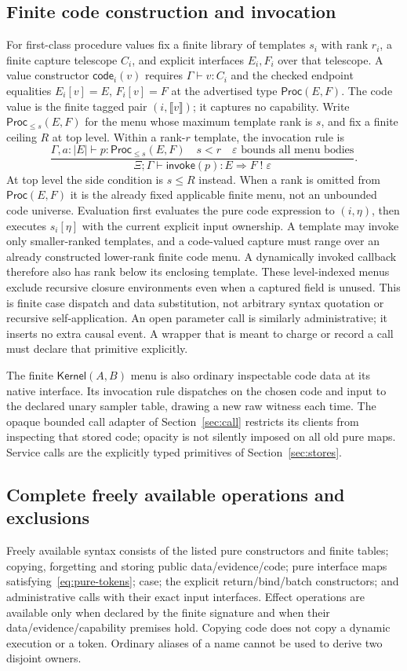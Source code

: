 \documentclass[11pt,a4paper]{article}
\theoremstyle{definition}
\newcommand{\Proc}{\mathsf{Proc}}
\newcommand{\Kernel}{\mathsf{Kernel}}
\newcommand{\den}[1]{\llbracket #1\rrbracket}
\begin{document}
\subsection{Finite code construction and invocation}
For first-class procedure values fix a finite library of templates
$s_i$ with rank $r_i$, a finite capture telescope $C_i$, and explicit
interfaces $E_i,F_i$ over that telescope. A value constructor
$\mathsf{code}_i(v)$ requires $\Gamma\vdash v:C_i$ and the checked endpoint
equalities $E_i[v]=E$, $F_i[v]=F$ at the advertised type $\Proc(E,F)$.
The code value is the finite tagged pair $(i,\den v)$; it captures no
capability. Write $\Proc_{\le s}(E,F)$ for the menu whose maximum template rank is
$s$, and fix a finite ceiling $R$ at top level. Within a rank-$r$ template,
the invocation rule is
\[
 \frac{\Gamma,a:|E|\vdash p:\Proc_{\le s}(E,F)
       \quad s<r\quad\varepsilon\text{ bounds all menu bodies}}
 {\Xi;\Gamma\vdash\mathsf{invoke}(p):E\Rightarrow F\;!\;\varepsilon}.
\]
At top level the side condition is $s\le R$ instead. When a rank is
omitted from $\Proc(E,F)$ it is the already fixed applicable finite menu,
not an unbounded code universe. Evaluation first evaluates the pure code
expression to $(i,\eta)$, then
executes $s_i[\eta]$ with the current explicit input ownership. A template
may invoke only smaller-ranked templates, and a code-valued capture must
range over an already constructed lower-rank finite code menu. A dynamically
invoked callback therefore also has rank below its enclosing template.
These level-indexed menus exclude recursive closure environments even when
a captured field is unused. This is finite case dispatch
and data substitution, not arbitrary syntax quotation or recursive
self-application. An open parameter call is similarly administrative; it
inserts no extra causal event. A wrapper that is meant to charge or record
a call must declare that primitive explicitly.

The finite $\Kernel(A,B)$ menu is also ordinary inspectable code data at
its native interface. Its invocation rule dispatches on the chosen code
and input to the declared unary sampler table, drawing a new raw witness
each time. The opaque bounded call adapter of Section~\ref{sec:call}
restricts its clients from inspecting that stored code; opacity is not
silently imposed on all old pure maps. Service calls are the explicitly
typed primitives of Section~\ref{sec:stores}.

\subsection{Complete freely available operations and exclusions}
Freely available syntax consists of the listed pure constructors and finite
tables; copying, forgetting and storing public data/evidence/code; pure
interface maps satisfying~\eqref{eq:pure-tokens}; case; the explicit
return/bind/batch constructors; and administrative calls with their exact
input interfaces. Effect operations are available only when declared by
the finite signature and when their data/evidence/capability premises hold.
Copying code does not copy a dynamic execution or a token. Ordinary aliases
of a name cannot be used to derive two disjoint owners.
\end{document}
